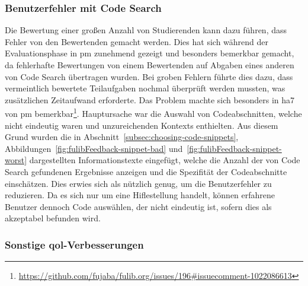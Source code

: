 \subsubsection{Benutzerfehler mit Code Search}

Die Bewertung einer großen Anzahl von Studierenden kann dazu führen, dass Fehler von den Bewertenden gemacht werden.
Dies hat sich während der Evaluationsphase in \ac{pm} zunehmend gezeigt und besonders bemerkbar gemacht, da fehlerhafte Bewertungen von einem Bewertenden auf Abgaben eines anderen von Code Search übertragen wurden.
Bei groben Fehlern führte dies dazu, dass vermeintlich bewertete Teilaufgaben nochmal überprüft werden mussten, was zusätzlichen Zeitaufwand erforderte.
Das Problem machte sich besonders in \ac{ha}7 von \ac{pm} bemerkbar\footnote{
    \url{https://github.com/fujaba/fulib.org/issues/196\#issuecomment-1022086613}
}.
Hauptursache war die Auswahl von Codeabschnitten, welche nicht eindeutig waren und unzureichenden Kontexts enthielten.
Aus diesem Grund wurden die in Abschnitt~\ref{subsec:choosing-code-snippets}, Abbildungen~\ref{fig:fulibFeedback-snippet-bad} und~\ref{fig:fulibFeedback-snippet-worst} dargestellten Informationstexte eingefügt, welche die Anzahl der von Code Search gefundenen Ergebnisse anzeigen und die Spezifität der Codeabschnitte einschätzen.
Dies erwies sich als nützlich genug, um die Benutzerfehler zu reduzieren.
Da es sich nur um eine Hiflestellung handelt, können erfahrene Benutzer dennoch Code auswählen, der nicht eindeutig ist, sofern dies als akzeptabel befunden wird.

\subsubsection{Sonstige \acl{qol}-Verbesserungen}

